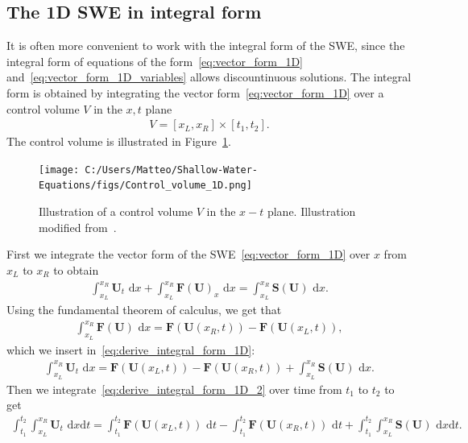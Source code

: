 \subsection{The 1D SWE in integral form}
It is often more convenient to work with the integral form of the SWE, since the integral form of equations of the form~\eqref{eq:vector_form_1D} and~\eqref{eq:vector_form_1D_variables} allows discountinuous solutions.
The integral form is obtained by integrating the vector form~\eqref{eq:vector_form_1D} over a control volume $V$ in the $x,t$ plane
\begin{align*}
    V = [x_L, x_R] \times [t_1, t_2].
\end{align*}
The control volume is illustrated in Figure~\ref{fig:control_volume_1D}.
\begin{figure}[H]
    \centering
    \texttt{[image: C:/Users/Matteo/Shallow-Water-Equations/figs/Control\_volume\_1D.png]}
    \caption{Illustration of a control volume $V$ in the $x-t$ plane. Illustration modified from~\cite{Toro2024}.}\label{fig:control_volume_1D}
\end{figure}
First we integrate the vector form of the SWE~\eqref{eq:vector_form_1D} over $x$ from $x_L$ to $x_R$ to obtain
\begin{align}\label{eq:derive_integral_form_1D}
    \int_{x_L}^{x_R} \mathbf{U}_t \text{ d}x + \int_{x_L}^{x_R} \mathbf{F(U)}_x \text{ d}x = \int_{x_L}^{x_R} \mathbf{S(U)} \text{ d}x.
\end{align}
Using the fundamental theorem of calculus, we get that 
\begin{align*}
    \int_{x_L}^{x_R} \mathbf{F}(\mathbf{U}) \text{ d}x = \mathbf{F}(\mathbf{U}(x_R, t)) - \mathbf{F}(\mathbf{U}(x_L, t)),
\end{align*}
which we insert in~\eqref{eq:derive_integral_form_1D}:
\begin{align}\label{eq:derive_integral_form_1D_2}
    \int_{x_L}^{x_R} \mathbf{U}_t \text{ d}x = \mathbf{F}(\mathbf{U}(x_L, t)) - \mathbf{F}(\mathbf{U}(x_R, t)) + \int_{x_L}^{x_R} \mathbf{S(U)} \text{ d}x.
\end{align}
Then we integrate~\eqref{eq:derive_integral_form_1D_2} over time from $t_1$ to $t_2$ to get
\begin{align*}
    \int_{t_1}^{t_2} \int_{x_L}^{x_R} \mathbf{U}_t \text{ d}x \text{d}t = \int_{t_1}^{t_2} \mathbf{F}(\mathbf{U}(x_L, t)) \text{ d}t - \int_{t_1}^{t_2} \mathbf{F}(\mathbf{U}(x_R, t)) \text{ d}t + \int_{t_1}^{t_2} \int_{x_L}^{x_R} \mathbf{S(U)} \text{ d}x \text{d}t.
\end{align*}
